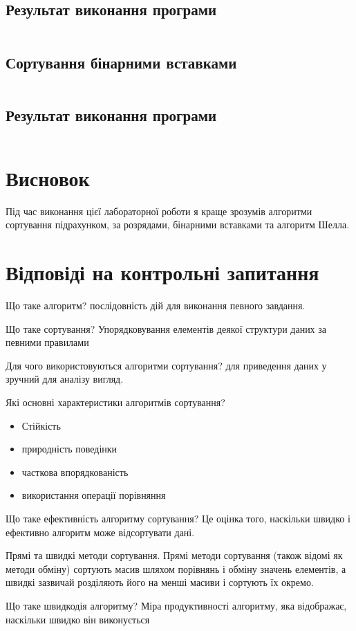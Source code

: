 \documentclass[a4paper, 12pt, oneside]{extarticle}
\begin{document}
\inputminted{c++}{counting_sort.cpp}
\subsection*{Результат виконання програми}
\inputminted{c++}{counting_sort_out}

\subsection*{Сортування бінарними вставками}
\inputminted{c++}{bin_ins_sort.cpp}
\subsection*{Результат виконання програми}
\inputminted{c++}{bin_ins_sort_out}

\section*{Висновок}

Під час виконання цієї лабораторної роботи я краще
зрозумів алгоритми сортування підрахунком, за розрядами,
бінарними вставками та алгоритм Шелла.

\section*{Відповіді на контрольні запитання}
\begin{itemize}
	\question Що таке алгоритм?
	\answer послідовність дій для виконання певного завдання.

	\question Що таке сортування?
	\answer  Упорядковування елементів деякої структури даних за певними правилами

	\question  Для чого використовуються алгоритми сортування?
	\answer для приведення даних у зручний для аналізу вигляд.

	\question Які основні характеристики алгоритмів сортування?
		\answer \begin{itemize}
				\item Стійкість
				\item природність поведінки
				\item часткова впорядкованість
				\item використання операції порівняння
			\end{itemize}
	\question Що таке ефективність алгоритму сортування?
	\answer Це оцінка того, наскільки швидко і ефективно алгоритм може відсортувати дані.

	\question Прямі та швидкі методи сортування.
	\answer Прямі методи сортування (також відомі як методи обміну) сортують масив шляхом порівнянь і обміну значень елементів, а швидкі зазвичай розділяють його на менші масиви і сортують їх окремо.

	\question  Що таке швидкодія алгоритму?
	\answer Міра продуктивності алгоритму, яка відображає, наскільки швидко він виконується
\end{itemize}
\end{document}
